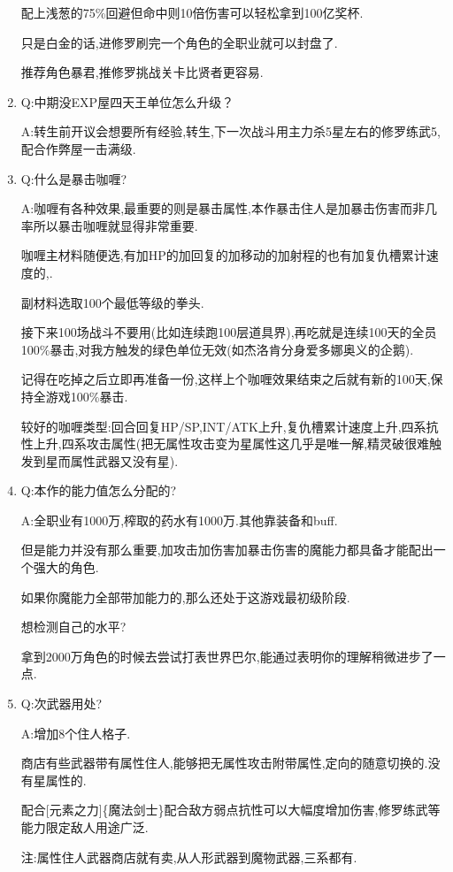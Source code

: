 \begin{enumerate}
	配上浅葱的75\%回避但命中则10倍伤害可以轻松拿到100亿奖杯.

	只是白金的话,进修罗刷完一个角色的全职业就可以封盘了.

	推荐角色暴君,推修罗挑战关卡比贤者更容易.

	\item
	Q:中期没EXP屋四天王单位怎么升级？

	A:转生前开议会想要所有经验,转生,下一次战斗用主力杀5星左右的修罗练武5,配合作弊屋一击满级.

	\item
	Q:什么是暴击咖喱?
	
	A:咖喱有各种效果,最重要的则是暴击属性,本作暴击住人是加暴击伤害而非几率所以暴击咖喱就显得非常重要.

	咖喱主材料随便选,有加HP的加回复的加移动的加射程的也有加复仇槽累计速度的,{\color{red}{也有开局自带异常状态的}}.

	副材料选取100个最低等级的拳头.

	接下来100场战斗不要用(比如连续跑100层道具界),再吃就是连续100天的全员100\%暴击,对我方触发的绿色单位无效(如杰洛肯分身爱多娜奥义的企鹅).

	记得在吃掉之后立即再准备一份,这样上个咖喱效果结束之后就有新的100天,保持全游戏100\%暴击.

	较好的咖喱类型:回合回复HP/SP,INT/ATK上升,复仇槽累计速度上升,四系抗性上升,四系攻击属性(把无属性攻击变为星属性这几乎是唯一解,精灵破很难触发到星而属性武器又没有星).

	\item
	Q:本作的能力值怎么分配的?

	A:全职业有1000万,榨取的药水有1000万.其他靠装备和buff.

	但是能力并没有那么重要,加攻击加伤害加暴击伤害的魔能力都具备才能配出一个强大的角色.

	如果你魔能力全部带加能力的,那么还处于这游戏最初级阶段.

	想检测自己的水平?

	拿到2000万角色的时候去尝试打表世界巴尔,能通过表明你的理解稍微进步了一点.

	\item
	Q:次武器用处?

	A:增加8个住人格子.

	商店有些武器带有属性住人,能够把无属性攻击附带属性,定向的随意切换的{\color{red}{精灵破}}.没有星属性的.

	配合[元素之力]\{魔法剑士\}配合敌方弱点抗性可以大幅度增加伤害,修罗练武等能力限定敌人用途广泛.

	注:属性住人武器商店就有卖,从人形武器到魔物武器,三系都有.


\end{enumerate}
